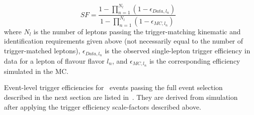 \begin{equation}
\label{eqn:triggerEffSF}
  SF =  { \frac{ {1 - \prod_{n=1}^{N_l} (1 - \epsilon_{Data,l_n})}} {1 - \prod_{n=1}^{N_l} (1 - \epsilon_{MC,l_n})} }
\end{equation}
where $N_l$ is the number of leptons passing the trigger-matching kinematic and
identification requirements
given above (not necessarily equal to the number of trigger-matched leptons),
$\epsilon_{Data,l_n}$ is the observed single-lepton trigger efficiency in data
for a lepton of flavour flavor $l_n$, and $\epsilon_{MC,l_n}$ is
the corresponding efficiency simulated in the MC. 

Event-level trigger efficiencies for \ZZ\ events passing the full event
selection described in the next section are listed in~. They
are derived from simulation after applying the trigger efficiency scale-factors
described above.

